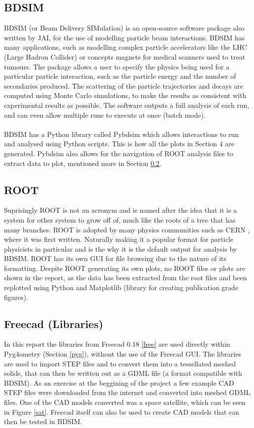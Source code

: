 \documentclass[12pt,a4paper]{article}
\begin{document}
\subsection{BDSIM}
\label{bdsim}
BDSIM (or Beam Delivery SIMulation) is an open-source software package also written by JAI, for the use of modelling particle beam interactions. BDSIM has many applications, such as modelling complex particle accelerators like the LHC (Large Hadron Collider) or concepts magnets for medical scanners used to treat tumours. The package allows a user to specify the physics being used for a particular particle interaction, such as the particle energy and the number of secondaries produced. The scattering of the particle trajectories and decays are computed using Monte Carlo simulations, to make the results as consistent with experimental results as possible. The software outputs a full analysis of each run, and can even allow multiple runs to execute at once (batch mode).
\\\\
BDSIM has a Python library called Pybdsim which allows interactions to run and analysed using Python scripts. This is how all the plots in Section 4 are generated. Pybdsim also allows for the navigation of ROOT analysis files to extract data to plot, mentioned more in Section \ref{root}.

\subsection{ROOT}\label{root}
Suprisingly ROOT is not an acronym and is named after the idea that it is a system for other system to grow off of, much like the roots of a tree that has many branches. ROOT is adopted by many physics communities such as CERN \cite{cern}, where it was first written. Naturally making it a popular format for particle physicists in particular and is the why it is the default output for analysis by BDSIM. ROOT has its own GUI for file browsing due to the nature of its formatting. Despite ROOT generating its own plots, no ROOT files or plots are shown in the report, as the data has been extracted from the root files and been replotted using Python and Matplotlib (library for creating publication grade figures).

\subsection{Freecad (Libraries)}
In this report the libraries from Freecad 0.18 \ref{free} are used directly within Pyg4ometry (Section \ref{pyg}), without the use of the Freecad GUI. The libraries are used to import STEP files and to convert them into a tessellated meshed solids, that can then be written out as a GDML file (a format compatible with BDSIM). As an exercise at the beggining of the project a few example CAD STEP files were downloaded from the internet and converted into meshed GDML files. One of the CAD models converted was a space satellite, which can be seen in Figure \ref{sat}. Freecad itself can also be used to create CAD models that can then be tested in BDSIM. 
\end{document}
